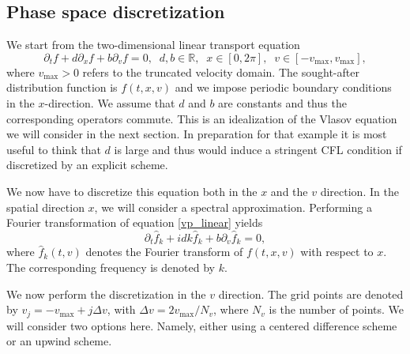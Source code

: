 \subsection{Phase space discretization}

We start from the two-dimensional linear transport equation
\begin{equation}
	\label{vp_linear}
  \partial_t f + d\partial_x f + b\partial_v f = 0, \;\; d, b\in\mathbb{R}, \;\; x\in [0, 2 \pi], \;\; v\in [-v_{\max},v_{\max}], 
\end{equation}
where $v_{\max}>0$  refers to the truncated velocity domain. The sought-after distribution function is $f(t,x,v)$ and we impose periodic boundary conditions in the $x$-direction. We assume that $d$ and $b$ are constants and thus the corresponding operators commute. This is an idealization of the Vlasov equation we will consider in the next section. In preparation for that example it is most useful to think that $d$ is large and thus would induce a stringent CFL condition if discretized by an explicit scheme.

We now have to discretize this equation both in the $x$ and the $v$ direction. In the spatial direction $x$, we will consider a spectral approximation. Performing a Fourier transformation of equation \eqref{vp_linear} yields
\begin{equation} 
  \label{fourier_x_vlasov}
  \partial_t \hat{f}_{k} +  i d k\hat{f}_{k} +b \partial_v \hat{f}_{k} = 0,
\end{equation} 
where $\hat{f}_k(t,v)$ denotes the Fourier transform of $f(t,x,v)$ with respect to $x$. The corresponding frequency is denoted by $k$. 

We now perform the discretization in the $v$ direction. The grid points are denoted by $v_j=-v_{\max}+j \Delta v$, with $\Delta v=2v_{\max}/N_v$, where $N_v$ is the number of points. We will consider two options here. Namely, either using a centered difference scheme or an upwind scheme.

